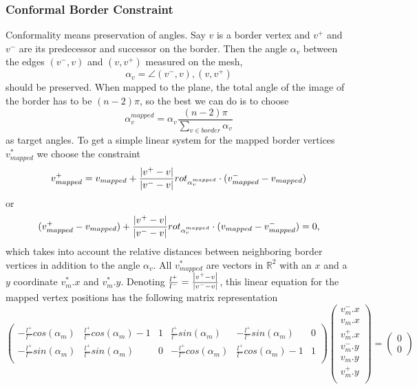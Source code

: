 \subsubsection*{Conformal Border Constraint}
Conformality means preservation of angles. Say $v$ is a border vertex and $v^+$ and $v^-$ are its predecessor and successor on the border. Then the angle $\alpha_v$ between the edges $(v^-,v)$ and $(v,v^+)$ measured on the mesh,
\[\alpha_v = \angle (v^-,v),(v,v^+)\]
should be preserved. When mapped to the plane, the total angle of the image of the border has to be $(n-2)\pi$, so the best we can do is to choose
\begin{equation}\alpha_v^{mapped} = \alpha_v \frac{(n-2) \pi}{\sum_{v \in border} \alpha_v}\label{eq:conformalAngles}\end{equation}
as target angles. To get a simple linear system for the mapped border vertices $v_{mapped}^*$ we choose the constraint
\begin{equation} v^+_{mapped} = v_{mapped} + \frac{\left| v^+-v \right|}{\left| v^- -v \right|}rot_{\alpha_v^{mapped}} \cdot (v_{mapped}^- - v_{mapped})\label{eq:conformalBorder}\end{equation}
or
\[ (v^+_{mapped}-v_{mapped} ) + \frac{\left| v^+-v \right|}{\left| v^- -v \right|}rot_{\alpha_v^{mapped}} \cdot (v_{mapped} - v_{mapped}^- )= 0,\]
which takes into account the relative distances between neighboring border vertices in addition to the angle $\alpha_v$. All $v_{mapped}^*$ are vectors in $\mathbb R^2$ with an $x$ and a $y$ coordinate $v_m^*.x$ and $v_m^*.y$. Denoting $\frac{l^+}{l^-} = \frac{\left| v^+-v \right|}{\left| v^- -v \right|}$, this linear equation for the mapped vertex positions has the following matrix representation
\[\begin{pmatrix}
-\frac{l^+}{l^-}cos(\alpha_{m})& \frac{l^+}{l^-}cos(\alpha_{m}) -1 & 1 & \frac{l^+}{l^-}sin(\alpha_{m}) & -\frac{l^+}{l^-}sin(\alpha_{m}) & 0\\
-\frac{l^+}{l^-}sin(\alpha_{m}) & \frac{l^+}{l^-}sin(\alpha_{m})  & 0  & - \frac{l^+}{l^-}cos(\alpha_{m}) & \frac{l^+}{l^-}cos(\alpha_{m}) -1 & 1\\
 
\end{pmatrix} \begin{pmatrix}
v_{m}^-.x \\
v_{m}.x \\
v_{m}^+.x \\
v_{m}^-.y \\
v_{m}.y \\
v_{m}^+.y \\
\end{pmatrix} = \begin{pmatrix}
0 \\
0
\end{pmatrix}\]

